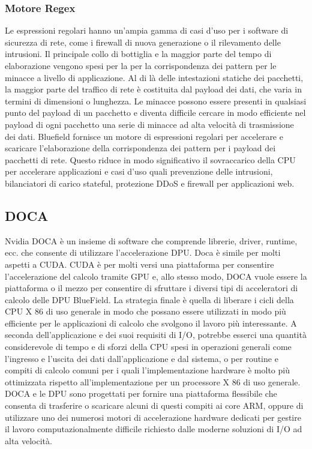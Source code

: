 \documentclass[binding=0.6cm]{sapthesis}
\theoremstyle{definition}
\begin{document}
\subsubsection{Motore Regex}
Le espressioni regolari hanno un'ampia gamma di casi d'uso per i software di sicurezza di rete, come i firewall di nuova generazione o il rilevamento delle intrusioni. 
Il principale collo di bottiglia e la maggior parte del tempo di elaborazione vengono spesi per la per la corrispondenza dei pattern per le minacce a livello di applicazione. 
Al di là delle intestazioni statiche dei pacchetti, la maggior parte del traffico di rete è 
costituita dal payload dei dati, che varia in termini di dimensioni o lunghezza. 
Le minacce possono essere presenti in qualsiasi punto del payload di un pacchetto e diventa 
difficile cercare in modo efficiente nel payload di ogni pacchetto una serie di minacce ad alta velocità di trasmissione dei dati. Bluefield fornisce un motore di espressioni regolari per accelerare
e scaricare l'elaborazione della corrispondenza dei pattern per i payload dei pacchetti di rete.
Questo riduce in modo significativo il sovraccarico della CPU per accelerare applicazioni e casi d'uso quali
prevenzione delle intrusioni, bilanciatori di carico stateful, protezione DDoS e firewall per applicazioni web.

\subsection{DOCA}

Nvidia DOCA è un insieme di software che comprende librerie, driver, runtime, ecc. che consente di utilizzare l'accelerazione DPU. 
Doca è simile per molti aspetti a CUDA.
CUDA è per molti versi una piattaforma per consentire l'accelerazione del calcolo tramite GPU e,
allo stesso modo, DOCA vuole essere la piattaforma o il mezzo per consentire  di sfruttare i 
diversi tipi di acceleratori di calcolo delle DPU BlueField.
La strategia finale è quella di liberare i cicli della CPU X 86 di uso generale in modo che 
possano essere utilizzati in modo più efficiente per le applicazioni di calcolo che svolgono
 il lavoro più interessante.
A seconda dell'applicazione e dei suoi requisiti di I/O, potrebbe esserci una quantità
considerevole di tempo e di sforzi della CPU spesi in operazioni generali come l'ingresso 
e l'uscita dei dati dall'applicazione e dal sistema, o per routine e compiti di calcolo comuni 
per i quali l'implementazione hardware è molto più ottimizzata rispetto all'implementazione 
per un processore X 86 di uso generale. DOCA e le DPU sono progettati per fornire una piattaforma
flessibile che consenta di trasferire o scaricare alcuni di questi compiti ai core ARM,
oppure di utilizzare uno dei numerosi motori di accelerazione hardware dedicati per gestire
il lavoro computazionalmente difficile richiesto dalle moderne soluzioni di I/O ad alta velocità.
\end{document}
